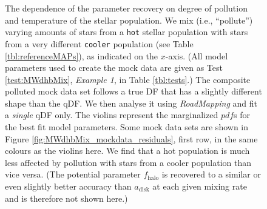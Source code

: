 \documentclass[iop,revtex4,numberedappendix,appendixfloats]{emulateapj}
\newcommand{\pdf}{\ensuremath{pdf}}
\newcommand{\RM}{{\sl RoadMapping}}
\begin{document}
\begin{figure}[!htbp]
\caption{The dependence of the parameter recovery on degree of pollution and temperature of the stellar population. We mix (i.e., ``pollute'') varying amounts of stars from a \texttt{hot} stellar population with stars from a very different \texttt{cooler} population (see Table \ref{tbl:referenceMAPs}), as indicated on the $x$-axis. (All model parameters used to create the mock data are given as Test \ref{test:MWdhbMix}, \emph{Example 1}, in Table \ref{tbl:tests}.) The composite polluted mock data set follows a true DF that has a slightly different shape than the qDF. We then analyse it using \RM{} and fit a \emph{single} qDF only. The violins represent the marginalized \pdf{}s for the best fit model parameters. Some mock data sets are shown in Figure \ref{fig:MWdhbMix_mockdata_residuals}, first row, in the same colours as the violins here. We find that a hot population is much less affected by pollution with stars from a cooler population than vice versa. (The potential parameter $f_\text{halo}$ is recovered to a similar or even slightly better accuracy than $a_\text{disk}$ at each given mixing rate and is therefore not shown here.)}
\label{fig:MWdhbMixCont}
\end{figure}
\end{document}
